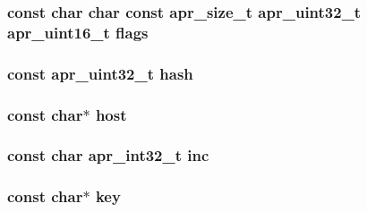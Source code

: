 \subsubsection[{\texorpdfstring{flags}{flags}}]{\setlength{\rightskip}{0pt plus 5cm}const char char const {\bf apr\+\_\+size\+\_\+t} {\bf apr\+\_\+uint32\+\_\+t} {\bf apr\+\_\+uint16\+\_\+t} flags}\hypertarget{group__APR__Util__RC_gad1f784cc84e0ca7eb04ee77df95eb26a}{}\label{group__APR__Util__RC_gad1f784cc84e0ca7eb04ee77df95eb26a}
\subsubsection[{\texorpdfstring{hash}{hash}}]{ const {\bf apr\+\_\+uint32\+\_\+t} hash}\hypertarget{group__APR__Util__RC_gaf86d4a5b21e961280c272d79aacf26ca}{}\label{group__APR__Util__RC_gaf86d4a5b21e961280c272d79aacf26ca}
\subsubsection[{\texorpdfstring{host}{host}}]{\setlength{\rightskip}{0pt plus 5cm}const char$\ast$ host}\hypertarget{group__APR__Util__RC_gae032e164f1daa754d6fbb79d59723931}{}\label{group__APR__Util__RC_gae032e164f1daa754d6fbb79d59723931}
\subsubsection[{\texorpdfstring{inc}{inc}}]{\setlength{\rightskip}{0pt plus 5cm}const char {\bf apr\+\_\+int32\+\_\+t} inc}\hypertarget{group__APR__Util__RC_ga3032890ab2e5d12bfb3b92c280a84216}{}\label{group__APR__Util__RC_ga3032890ab2e5d12bfb3b92c280a84216}
\subsubsection[{\texorpdfstring{key}{key}}]{\setlength{\rightskip}{0pt plus 5cm}const char$\ast$ key}\hypertarget{group__APR__Util__RC_gacd3d88da3c0e0313c3645ff34f62f542}{}\label{group__APR__Util__RC_gacd3d88da3c0e0313c3645ff34f62f542}
